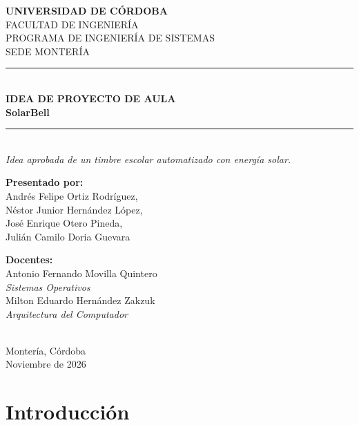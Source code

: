 \documentclass[12pt,letterpaper]{article}
\begin{document}
\begin{titlepage}
\singlespacing
\centering
\vspace*{1cm}
{\Large \textbf{UNIVERSIDAD DE CÓRDOBA}}\\[0.3cm]
{\large FACULTAD DE INGENIERÍA}\\[0.2cm]
{\large PROGRAMA DE INGENIERÍA DE SISTEMAS}\\[0.2cm]
{\large SEDE MONTERÍA}\\[1.7cm]
\rule{\textwidth}{0.5pt}\\[0.3cm]
{\Huge \textbf{IDEA DE PROYECTO DE AULA}}\\[0.35cm]
{\LARGE \textbf{SolarBell}}\\[0.3cm]
\rule{\textwidth}{0.5pt}\\[0.5cm]
{\large \textit{Idea aprobada de un timbre escolar automatizado con energía solar.}}\\[2.2cm]
\begin{minipage}[t]{0.42\textwidth}
\begin{flushleft}
\textbf{Presentado por:}\\[0.2cm]
Andrés Felipe Ortiz Rodríguez,\\
Néstor Junior Hernández López,\\
José Enrique Otero Pineda,\\
Julián Camilo Doria Guevara
\end{flushleft}
\end{minipage}\hfill
\begin{minipage}[t]{0.52\textwidth}
\begin{flushright}
\textbf{Docentes:}\\[0.2cm]
Antonio Fernando Movilla Quintero\\
\textit{Sistemas Operativos}\\[0.3cm]
Milton Eduardo Hernández Zakzuk\\
\textit{Arquitectura del Computador}
\end{flushright}
\end{minipage}\\[2.2cm]
\vfill
Montería, Córdoba\\
Noviembre de 2026
\end{titlepage}
\newpage

\doublespacing
\setcounter{tocdepth}{3}
\tableofcontents
\listoftables
\listoffigures
\newpage

\section*{Introducción}
\end{document}

